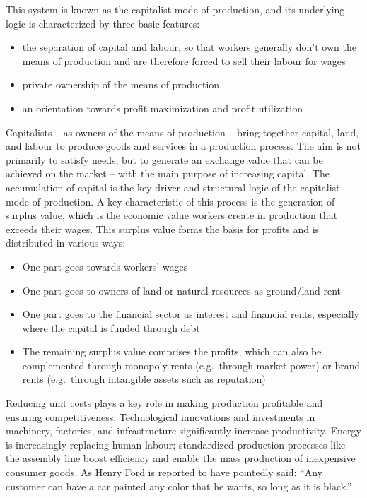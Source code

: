 \documentclass[
  a4paper,
  DIV=11,
  numbers=noendperiod,
  oneside,
  openany]{scrreprt}
\begin{document}
This system is known as the capitalist mode of production, and its
underlying logic is characterized by three basic features:

\begin{itemize}
\item
  the separation of capital and labour, so that workers generally don't
  own the means of production and are therefore forced to sell their
  labour for wages
\item
  private ownership of the means of production
\item
  an orientation towards profit maximization and profit utilization
\end{itemize}

Capitalists -- as owners of the means of production -- bring together
capital, land, and labour to produce goods and services in a production
process. The aim is not primarily to satisfy needs, but to generate an
exchange value that can be achieved on the market -- with the main
purpose of increasing capital. The accumulation of capital is the key
driver and structural logic of the capitalist mode of production. A key
characteristic of this process is the generation of surplus value, which
is the economic value workers create in production that exceeds their
wages. This surplus value forms the basis for profits and is distributed
in various ways:

\begin{itemize}
\item
  One part goes towards workers' wages
\item
  One part goes to owners of land or natural resources as ground/land
  rent
\item
  One part goes to the financial sector as interest and financial rents,
  especially where the capital is funded through debt
\item
  The remaining surplus value comprises the profits, which can also be
  complemented through monopoly rents (e.g.~through market power) or
  brand rents (e.g.~through intangible assets such as reputation)
\end{itemize}

Reducing unit costs plays a key role in making production profitable and
ensuring competitiveness. Technological innovations and investments in
machinery, factories, and infrastructure significantly increase
productivity. Energy is increasingly replacing human labour;
standardized production processes like the assembly line boost
efficiency and enable the mass production of inexpensive consumer goods.
As Henry Ford is reported to have pointedly said: ``Any customer can
have a car painted any color that he wants, so long as it is black.''
\end{document}

